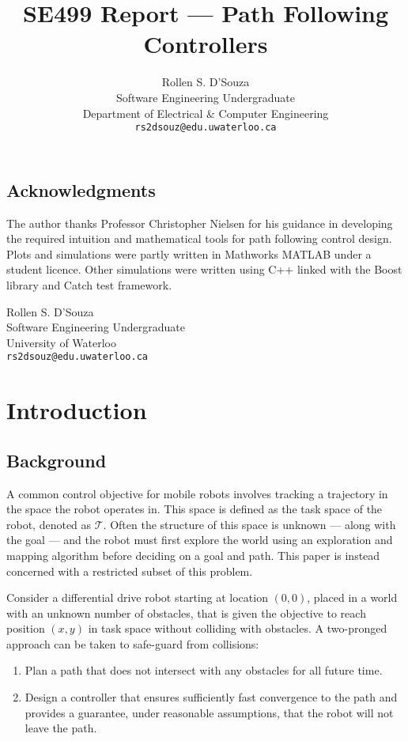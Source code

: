 \documentclass[oneside, 11pt]{book}
\author{{Rollen S. D'Souza}\\
        {Software Engineering Undergraduate}\\
        {Department of Electrical \& Computer Engineering}\\
        {\texttt{rs2dsouz@edu.uwaterloo.ca}}}
\title{\textbf{SE499 Report --- Path Following Controllers}}
\date{}
\begin{document}
\maketitle

\frontmatter
\section*{Acknowledgments}
The author thanks Professor Christopher Nielsen for his guidance in developing the required intuition and mathematical tools for path following control design. Plots and simulations were partly written in Mathworks MATLAB under a student licence. Other simulations were written using C++ linked with the Boost library and Catch test framework.

\begin{flushright}
Rollen S. D'Souza\\
Software Engineering Undergraduate\\
University of Waterloo\\
\texttt{rs2dsouz@edu.uwaterloo.ca}
\end{flushright}

\tableofcontents

\printnomenclature[3cm]

\cleardoublepage
{}
{}
\printglossary[title=Acronyms and Initialisms]

\mainmatter
\pagestyle{fancy}
\renewcommand{\sectionmark}[1]{\markright{\thesection.\ #1}}

\chapter{Introduction}

\section{Background}
A common control objective for mobile robots involves tracking a trajectory in the space the robot operates in. This space is defined as the task space of the robot, denoted as $\mathcal{T}$. Often the structure of this space is unknown --- along with the goal --- and the robot must first explore the world using an exploration and mapping algorithm before deciding on a goal and path.  This paper is instead concerned with a restricted subset of this problem.

Consider a differential drive robot starting at location $(0,0)$, placed in a world with an unknown number of obstacles, that is given the objective to reach position $(x,y)$ in task space without colliding with obstacles. A two-pronged approach can be taken to safe-guard from collisions:
\begin{enumerate}
    \item Plan a path that does not intersect with any obstacles for all future time.
    \item Design a controller that ensures sufficiently fast convergence to the path and provides a guarantee, under reasonable assumptions, that the robot will not leave the path.
\end{enumerate}
\end{document}
